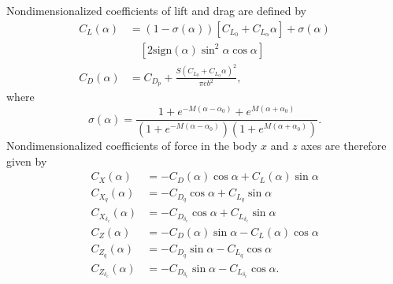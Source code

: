 \documentclass[letterpaper, 10 pt, conference]{ieeeconf}  %
\begin{document}
\begin{appendices}
		Nondimensionalized coefficients of lift and drag are defined by
		\begin{align}
		C_{L}\left(\alpha\right) & =\left(1-\sigma\left(\alpha\right)\right)\left[C_{L_{0}}+C_{L_{\alpha}}\alpha\right]+\sigma\left(\alpha\right) \\ & \quad \left[2\mathrm{sign}\left(\alpha\right)\sin^{2}\alpha\cos\alpha\right]\nonumber\\
		C_{D}\left(\alpha\right) & =C_{D_{p}}+\frac{S\left(C_{L_{0}}+C_{L_{\alpha}}\alpha\right)^{2}}{\pi eb^{2}},
		\end{align}
		where
		\begin{equation}
		\sigma\left(\alpha\right) =\frac{1+e^{-M\left(\alpha-\alpha_{0}\right)}+e^{M\left(\alpha+\alpha_{0}\right)}}{\left(1+e^{-M\left(\alpha-\alpha_{0}\right)}\right)\left(1+e^{M\left(\alpha+\alpha_{0}\right)}\right)}.
		\end{equation}
		Nondimensionalized coefficients of force in the body $x$ and $z$ axes are therefore given by
		\begin{align}
		C_{X}\left(\alpha\right) & =-C_{D}\left(\alpha\right)\cos\alpha+C_{L}\left(\alpha\right)\sin\alpha\\
		C_{X_{q}}\left(\alpha\right) & =-C_{D_{q}}\cos\alpha+C_{L_{q}}\sin\alpha\\
		C_{X_{\delta_{e}}}\left(\alpha\right) & =-C_{D_{\delta_{e}}}\cos\alpha+C_{L_{\delta_{e}}}\sin\alpha\\
		C_{Z}\left(\alpha\right) & =-C_{D}\left(\alpha\right)\sin\alpha-C_{L}\left(\alpha\right)\cos\alpha\\
		C_{Z_{q}}\left(\alpha\right) & =-C_{D_{q}}\sin\alpha-C_{L_{q}}\cos\alpha\\
		C_{Z_{\delta_{e}}}\left(\alpha\right) & =-C_{D_{\delta_{e}}}\sin\alpha-C_{L_{\delta_{e}}}\cos\alpha.
		\end{align}
		

\end{appendices}
\end{document}

